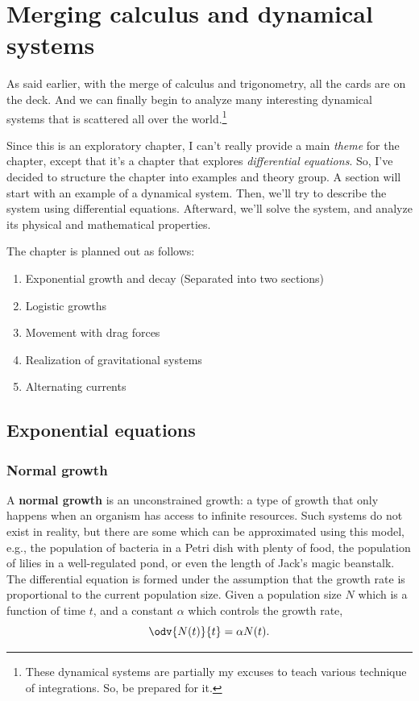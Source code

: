 \chapter{Merging calculus and dynamical systems}
\label{sec:calculus-and-physical-systems}

As said earlier, with the merge of calculus and trigonometry, all the cards are on the deck. And we can finally begin to analyze many interesting dynamical systems that is scattered all over the world.\footnote{These dynamical systems are partially my excuses to teach various technique of integrations. So, be prepared for it.}

Since this is an exploratory chapter, I can't really provide a main \emph{theme} for the chapter, except that it's a chapter that explores \emph{differential equations}. So, I've decided to structure the chapter into examples and theory group. A section will start with an example of a dynamical system. Then, we'll try to describe the system using differential equations. Afterward, we'll solve the system, and analyze its physical and mathematical properties.

The chapter is planned out as follows:
\begin{enumerate}
	\item Exponential growth and decay (Separated into two sections)
	\item Logistic growths
	\item Movement with drag forces
	\item Realization of gravitational systems
	\item Alternating currents
\end{enumerate}

\section{Exponential equations}

\subsection{Normal growth}

A \textbf{normal growth} is an unconstrained growth: a type of growth that only happens when an organism has access to infinite resources. Such systems do not exist in reality, but there are some which can be approximated using this model, e.g., the population of bacteria in a Petri dish with plenty of food, the population of lilies in a well-regulated pond, or even the length of Jack's magic beanstalk. The differential equation is formed under the assumption that the growth rate is proportional to the current population size. Given a population size $N$ which is a function of time $t$, and a constant $\alpha$ which controls the growth rate,
\begin{equation}
	\odv{N(t)}{t} = \alpha N(t). \label{eq:normal-growth-equation}
\end{equation}

